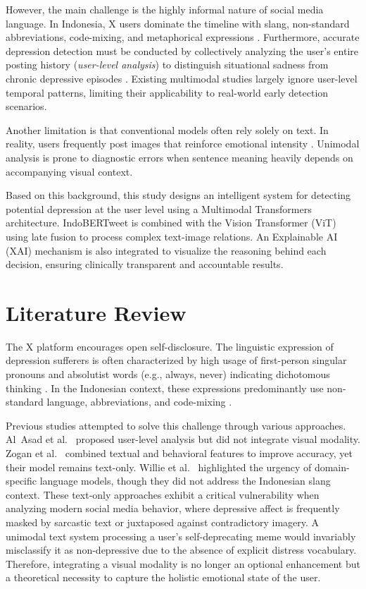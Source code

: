 \documentclass[conference]{IEEEtran}
\begin{document}
However, the main challenge is the highly informal nature of social
media language. In Indonesia, X users dominate the timeline with
slang, non-standard abbreviations, code-mixing, and metaphorical
expressions \cite{b_koto}. Furthermore, accurate depression detection
must be conducted by collectively analyzing the user's entire posting
history (\emph{user-level analysis}) to distinguish situational
sadness from chronic depressive episodes \cite{b_alasad, b_zogan}.
Existing multimodal studies largely ignore user-level temporal
patterns, limiting their applicability to real-world early detection
scenarios.

Another limitation is that conventional models often rely solely on
text. In reality, users frequently post images that reinforce emotional
intensity \cite{b_faiz}. Unimodal analysis is prone to diagnostic
errors when sentence meaning heavily depends on accompanying visual
context.

Based on this background, this study designs an intelligent system for
detecting potential depression at the user level using a Multimodal
Transformers architecture. IndoBERTweet is combined with the Vision
Transformer (ViT) using late fusion to process complex
text-image relations. An Explainable AI (XAI) mechanism is also
integrated to visualize the reasoning behind each decision, ensuring
clinically transparent and accountable results.

\section{Literature Review}

The X platform encourages open self-disclosure. The linguistic
expression of depression sufferers is often characterized by high
usage of first-person singular pronouns \cite{b_eichstaedt} and
absolutist words (e.g., always, never) indicating dichotomous thinking
\cite{b_almosaiwi}. In the Indonesian context, these expressions
predominantly use non-standard language, abbreviations, and
code-mixing \cite{b_koto}.

Previous studies attempted to solve this challenge through various
approaches. Al~Asad et al.\ \cite{b_alasad} proposed user-level
analysis but did not integrate visual modality. Zogan et al.\
\cite{b_zogan} combined textual and behavioral features to improve
accuracy, yet their model remains text-only. Willie et al.\
\cite{b_willie} highlighted the urgency of domain-specific language
models, though they did not address the Indonesian slang context.
These text-only approaches exhibit a critical vulnerability when analyzing modern social media behavior, where depressive affect is frequently masked by sarcastic text or juxtaposed against contradictory imagery. A unimodal text system processing a user's self-deprecating meme would invariably misclassify it as non-depressive due to the absence of explicit distress vocabulary. Therefore, integrating a visual modality is no longer an optional enhancement but a theoretical necessity to capture the holistic emotional state of the user.
\end{document}
